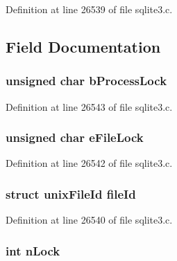 Definition at line 26539 of file sqlite3.\+c.



\subsection{Field Documentation}
\hypertarget{structunix_inode_info_a914e97ae932a15853079b35b212d870e}{}
\subsubsection[{b\+Process\+Lock}]{\setlength{\rightskip}{0pt plus 5cm}unsigned char b\+Process\+Lock}\label{structunix_inode_info_a914e97ae932a15853079b35b212d870e}


Definition at line 26543 of file sqlite3.\+c.

\hypertarget{structunix_inode_info_a074528e86f4417f8c3ce538e07908824}{}
\subsubsection[{e\+File\+Lock}]{\setlength{\rightskip}{0pt plus 5cm}unsigned char e\+File\+Lock}\label{structunix_inode_info_a074528e86f4417f8c3ce538e07908824}


Definition at line 26542 of file sqlite3.\+c.

\hypertarget{structunix_inode_info_a90d68cb51e9a69f9fca055fe70a066e4}{}
\subsubsection[{file\+Id}]{\setlength{\rightskip}{0pt plus 5cm}struct {\bf unix\+File\+Id} file\+Id}\label{structunix_inode_info_a90d68cb51e9a69f9fca055fe70a066e4}


Definition at line 26540 of file sqlite3.\+c.

\hypertarget{structunix_inode_info_a8928c430237c0a4baca86f43854c0649}{}
\subsubsection[{n\+Lock}]{\setlength{\rightskip}{0pt plus 5cm}int n\+Lock}\label{structunix_inode_info_a8928c430237c0a4baca86f43854c0649}



